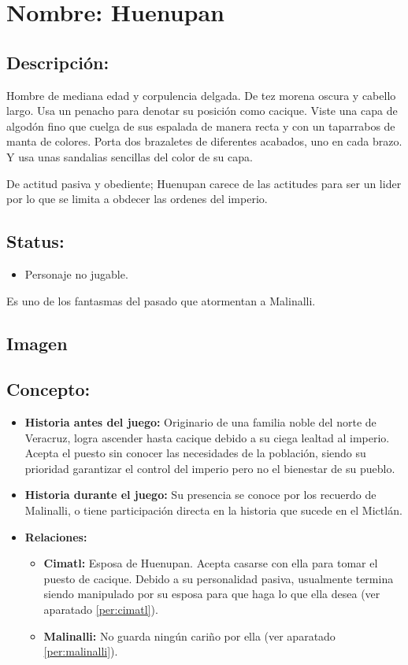\section{Nombre: Huenupan}  \label{per:huenupan}
\subsection{Descripción:} 
Hombre de mediana edad y corpulencia delgada. De tez morena oscura y cabello largo. Usa un penacho para denotar su posición como cacique. Viste una capa de algodón fino que cuelga de sus espalada de manera recta y con un taparrabos de manta de colores. Porta dos brazaletes de diferentes acabados, uno en cada brazo. Y usa unas sandalias sencillas del color de su capa.     
\\
\par
De actitud pasiva y obediente; Huenupan carece de las actitudes para ser un lider por lo que se limita a obdecer las ordenes del imperio. 
\subsection{Status:}
\begin{itemize}
		\item Personaje no jugable.
	\end{itemize}
Es uno de los fantasmas del pasado que atormentan a Malinalli.
\subsection{Imagen}
\subsection{Concepto:}
\begin{itemize}
	\item \textbf{Historia antes del juego:}
	Originario de una familia noble del  norte de Veracruz, logra ascender hasta cacique debido a su ciega lealtad al imperio. Acepta el puesto sin conocer las necesidades de la población, siendo su prioridad garantizar el control del imperio pero no el bienestar de su pueblo.  
	\item \textbf{Historia durante el juego:}
	Su presencia se conoce por los recuerdo de Malinalli, o tiene participación directa en la historia que sucede en el Mictlán.
	\item \textbf{Relaciones:}
	\begin{itemize}
		\item \textbf{Cimatl:} Esposa de Huenupan. Acepta casarse con ella para tomar el puesto de cacique. Debido a su personalidad pasiva, usualmente termina siendo manipulado por su esposa para que haga lo que ella desea (ver aparatado \ref{per:cimatl}). 
		\item \textbf{Malinalli:} No guarda ningún cariño por ella (ver aparatado \ref{per:malinalli}). 
	\end{itemize}                     
\end{itemize}

